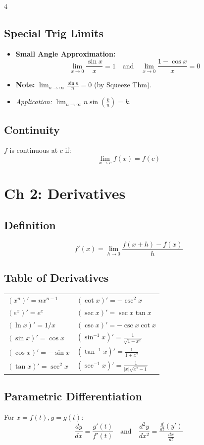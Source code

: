 \documentclass[8pt, landscape, a4paper]{scrartcl}
\begin{document}
\begin{multicols*}{4}
\subsection*{Special Trig Limits}
\begin{itemize}
    \item \textbf{Small Angle Approximation:}
    \[ \lim_{x \to 0} \frac{\sin x}{x} = 1 \quad \text{and} \quad \lim_{x \to 0} \frac{1 - \cos x}{x} = 0 \]
    \item \textbf{Note:} $\lim_{n \to \infty} \frac{\sin n}{n} = 0$ (by Squeeze Thm).
    \item \textit{Application:} $\lim_{n \to \infty} n \sin\left(\frac{k}{n}\right) = k$.
\end{itemize}

\subsection*{Continuity}
$f$ is continuous at $c$ if:
\[ \lim_{x \to c} f(x) = f(c) \]

\section*{Ch 2: Derivatives}
\subsection*{Definition}
\[ f'(x) = \lim_{h \to 0} \frac{f(x+h) - f(x)}{h} \]

\subsection*{Table of Derivatives}
\noindent
\begin{tabular}{@{}ll@{}}
    $(x^n)' = nx^{n-1}$   & $(\cot x)' = -\csc^2 x$ \\
    $(e^x)' = e^x$        & $(\sec x)' = \sec x \tan x$ \\
    $(\ln x)' = 1/x$      & $(\csc x)' = -\csc x \cot x$ \\
    $(\sin x)' = \cos x$  & $(\sin^{-1} x)' = \frac{1}{\sqrt{1-x^2}}$ \\
    $(\cos x)' = -\sin x$ & $(\tan^{-1} x)' = \frac{1}{1+x^2}$ \\
    $(\tan x)' = \sec^2 x$& $(\sec^{-1} x)' = \frac{1}{|x|\sqrt{x^2-1}}$ \\
\end{tabular}

\subsection*{Parametric Differentiation}
For $x=f(t), y=g(t)$:
\[ \frac{dy}{dx} = \frac{g'(t)}{f'(t)} \quad \text{and} \quad \frac{d^2y}{dx^2} = \frac{\frac{d}{dt}(y')}{\frac{dx}{dt}} \]


\end{multicols*}
\end{document}
